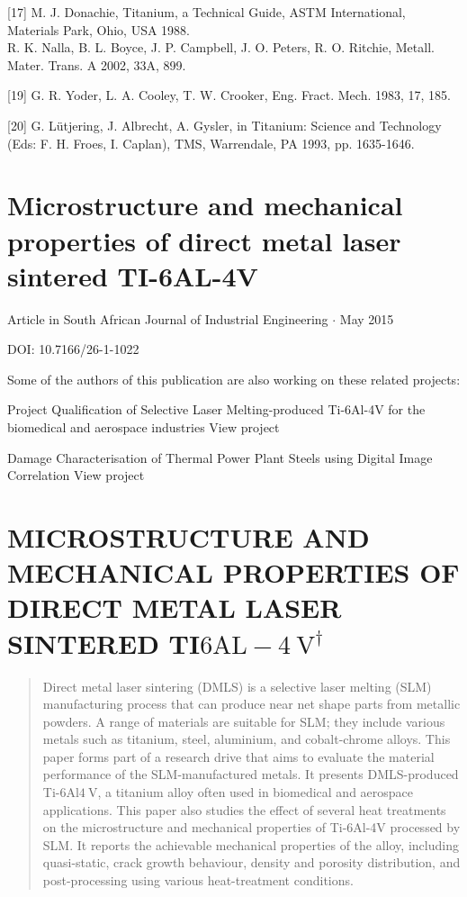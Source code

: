 \documentclass[10pt]{article}
\begin{document}
[17] M. J. Donachie, Titanium, a Technical Guide, ASTM International, Materials Park, Ohio, USA 1988.\\
[18] R. K. Nalla, B. L. Boyce, J. P. Campbell, J. O. Peters, R. O. Ritchie, Metall. Mater. Trans. A 2002, 33A, 899.

[19] G. R. Yoder, L. A. Cooley, T. W. Crooker, Eng. Fract. Mech. 1983, 17, 185.

[20] G. Lütjering, J. Albrecht, A. Gysler, in Titanium: Science and Technology (Eds: F. H. Froes, I. Caplan), TMS, Warrendale, PA 1993, pp. 1635-1646.

\section*{Microstructure and mechanical properties of direct metal laser sintered TI-6AL-4V}
Article in South African Journal of Industrial Engineering $\cdot$ May 2015

DOI: 10.7166/26-1-1022

Some of the authors of this publication are also working on these related projects:

Project Qualification of Selective Laser Melting-produced Ti-6Al-4V for the biomedical and aerospace industries View project

Damage Characterisation of Thermal Power Plant Steels using Digital Image Correlation View project

\section*{MICROSTRUCTURE AND MECHANICAL PROPERTIES OF DIRECT METAL LASER SINTERED TI$6 \mathrm{AL}-4 \mathrm{~V}^{\dagger}$ }


\begin{abstract}
Direct metal laser sintering (DMLS) is a selective laser melting (SLM) manufacturing process that can produce near net shape parts from metallic powders. A range of materials are suitable for SLM; they include various metals such as titanium, steel, aluminium, and cobalt-chrome alloys. This paper forms part of a research drive that aims to evaluate the material performance of the SLM-manufactured metals. It presents DMLS-produced Ti-6Al$4 \mathrm{~V}$, a titanium alloy often used in biomedical and aerospace applications. This paper also studies the effect of several heat treatments on the microstructure and mechanical properties of Ti-6Al-4V processed by SLM. It reports the achievable mechanical properties of the alloy, including quasi-static, crack growth behaviour, density and porosity distribution, and post-processing using various heat-treatment conditions.
\end{abstract}
\end{document}
